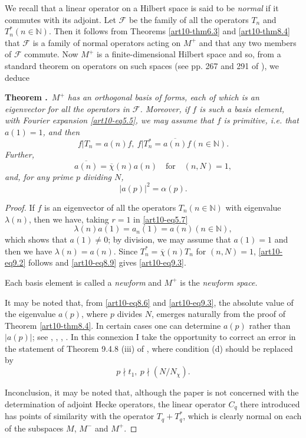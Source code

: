 We recall that a linear operator on a Hilbert space is said to be {\em normal} if it commutes with its adjoint. Let $\mathscr{F}$ be the family of all the operators $T_{n}$ and $T^{*}_{n}(n\in \mathbb{N})$. Then it follows from Theorems \ref{art10-thm6.3} and \ref{art10-thm8.4} that $\mathscr{F}$ is a family of normal operators acting on $M^{+}$ and that any two members of $\mathscr{F}$ commute. Now $M^{+}$ is a finite-dimensional Hilbert space and so, from a standard theorem on operators on such spaces (see pp. 267 and 291 of \cite{art10-key2}), we deduce

\medskip
\noindent
{\bf Theorem .\label{art10-thm9.1}}~{\em $M^{+}$ has an orthogonal basis of forms, each of which is an eigenvector for all the operators in $\mathscr{F}$. Moreover, if $f$ is such a basis element, with Fourier expansion \eqref{art10-eq5.5}, we may assume that $f$ is primitive, i.e. that $a(1)=1$, and then}
\setcounter{equation}{0}
\begin{equation}
f|T_{n}=a(n)f, \ f|T^{*}_{n}=\overline{a(n)}f(n\in\mathbb{N}).\label{art10-eq9.1}
\end{equation}
{\em Further,}
\begin{equation}
\overline{a(n)}=\overline{\chi}(n)a(n)\text{~~ for~~ } (n,N)=1,\label{art10-eq9.2}
\end{equation}
{\em and, for any prime $p$ dividing $N$,}
\begin{equation}
|a(p)|^{2}=\alpha(p).\label{art10-eq9.3}
\end{equation}

\begin{proof}
If $f$ is an eigenvector of all the operators $T_{n}(n\in \mathbb{N})$ with eigenvalue $\lambda(n)$, then we have, taking $r=1$ in \eqref{art10-eq5.7}
$$
\lambda(n)a(1)=a_{n}(1)=a(n)(n\in \mathbb{N}),
$$
which shows that $a(1)\neq 0$; by division, we may assume that $a(1)=1$ and then we have $\lambda(n)=a(n)$. Since $T^{*}_{n}=\overline{\chi}(n)T_{n}$ for $(n,N)=1$, \eqref{art10-eq9.2} follows and \eqref{art10-eq8.9} gives \eqref{art10-eq9.3}.

Each basis element is called a {\em newform} and $M^{+}$ is the {\em newform space.}

It may be noted that, from \eqref{art10-eq8.6} and \eqref{art10-eq9.3}, the absolute value of the eigenvalue $a(p)$, where $p$ divides $N$, emerges naturally from the proof of Theorem \ref{art10-thm8.4}. In certain cases one can determine $a(p)$ rather than $|a(p)|$; see \cite{art10-key1}, \cite{art10-key4}, \cite{art10-key6}, \cite{art10-key9}. In this connexion I take the opportunity to correct an error in the statement of Theorem 9.4.8 (iii) of \cite{art10-key9}, where condition (d) should be replaced by
$$
p\nmid t_{1}, \ p\nmid (N/N_{\chi}).
$$ 

In\pageoriginale conclusion, it may be noted that, although the paper \cite{art10-key5} is not concerned with the determination of adjoint Hecke operators, the linear operator $C_{q}$ there introduced has points of similarity with the operator $T_{q}+T^{*}_{q}$, which is clearly normal on each of the subspaces $M$, $M^{-}$ and $M^{+}$.
\end{proof}

